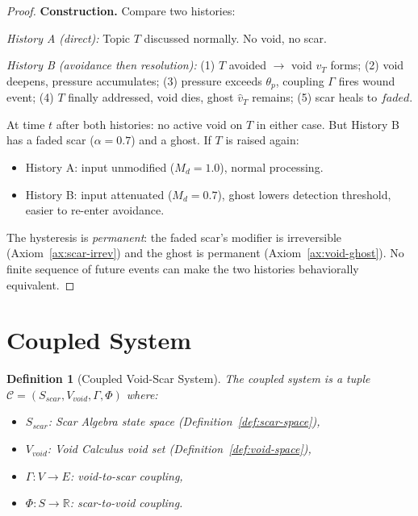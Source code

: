 \documentclass[11pt]{article}
\newtheorem{definition}[theorem]{Definition}
\begin{document}
\begin{proof}
\textbf{Construction.} Compare two histories:

\emph{History A (direct):} Topic $T$ discussed normally. No void, no scar.

\emph{History B (avoidance then resolution):} (1) $T$ avoided $\to$ void $v_T$ forms; (2) void deepens, pressure accumulates; (3) pressure exceeds $\theta_p$, coupling $\Gamma$ fires wound event; (4) $T$ finally addressed, void dies, ghost $\hat{v}_T$ remains; (5) scar heals to $faded$.

At time $t$ after both histories: no active void on $T$ in either case. But History B has a faded scar ($\alpha = 0.7$) and a ghost. If $T$ is raised again:
\begin{itemize}
\item History A: input unmodified ($M_d = 1.0$), normal processing.
\item History B: input attenuated ($M_d = 0.7$), ghost lowers detection threshold, easier to re-enter avoidance.
\end{itemize}

The hysteresis is \emph{permanent}: the faded scar's modifier is irreversible (Axiom~\ref{ax:scar-irrev}) and the ghost is permanent (Axiom~\ref{ax:void-ghost}). No finite sequence of future events can make the two histories behaviorally equivalent.
\end{proof}

\section{Coupled System}
\label{sec:coupled}

\begin{definition}[Coupled Void-Scar System]
\label{def:coupled}
The coupled system is a tuple $\mathcal{C} = (S_{scar}, V_{void}, \Gamma, \Phi)$ where:
\begin{itemize}
\item $S_{scar}$: Scar Algebra state space (Definition~\ref{def:scar-space}),
\item $V_{void}$: Void Calculus void set (Definition~\ref{def:void-space}),
\item $\Gamma: V \to E$: void-to-scar coupling,
\item $\Phi: S \to \mathbb{R}$: scar-to-void coupling.
\end{itemize}
\end{definition}
\end{document}
